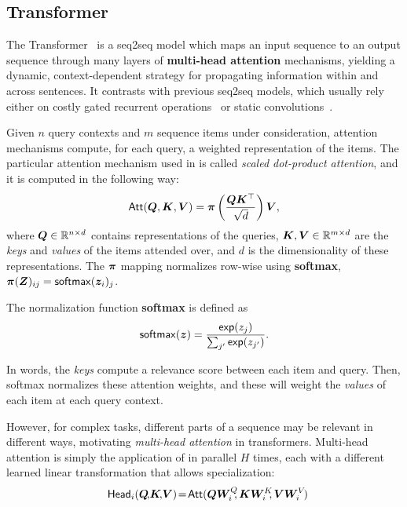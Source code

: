 \subsection{Transformer}

The Transformer~\citep{vaswani2017attention} is a seq2seq model which
maps an input sequence to an output sequence through many layers of
\textbf{multi-head attention} mechanisms, yielding a dynamic,
context-dependent strategy for propagating information within and
across sentences. It contrasts with previous seq2seq models, which
usually rely either on costly gated recurrent operations~\citep[often
    LSTMs:][]{bahdanau2014neural,luong2015effective} or static
convolutions~\citep{convseq}.

Given $n$ query contexts and $m$ sequence items under consideration,
attention mechanisms compute, for each query, a weighted
representation of the items. The particular attention mechanism used
in \citet{vaswani2017attention} is called \emph{scaled dot-product
    attention}, and it is computed in the following way:
%
\begin{equation}
    \operatorname{\mathsf{Att}}(\bm{Q}, \bm{K}, \bm{V}) = \bm{\pi}
    \left(\frac{\bm{Q}\bm{K}^\top}{\sqrt{d}}\right) \bm{V},
    \label{eq:att_scaled_dot}
\end{equation}
%
where $\bm{Q} \in \mathbb{R}^{n \times d}$ contains
representations of the queries, $\bm{K}, \bm{V} \in \mathbb{R}^{m \times
        d}$ are the \emph{keys} and \emph{values} of the items attended over,
and $d$ is the dimensionality of these representations. The $\bm{\pi}$
mapping normalizes row-wise using \textbf{softmax},
$\bm{\pi}(\bm{Z})_{ij} = \operatorname*{\mathsf{softmax}}(\bm{z}_i)_j$.

\begin{definition}
    The normalization function \textbf{softmax} is defined as
    \begin{equation}\label{eq:softmax}
        \operatorname*{\mathsf{softmax}}(\bm{z}) = \frac{\operatorname*{\mathsf{exp}}(z_j)}{\sum_{j'} \operatorname*{\mathsf{exp}}(z_{j'})}.
    \end{equation}
\end{definition}

In words, the \emph{keys} compute a relevance score between each item
and query. Then, softmax normalizes these attention weights, and
these will weight the \emph{values} of each item at each query
context.

However, for complex tasks, different parts of a sequence may be
relevant in different ways, motivating \emph{multi-head attention} in
transformers. Multi-head attention is simply the application of
 in parallel $H$ times, each with a
different learned linear transformation that allows specialization:
%
\begin{equation}\label{eq:head}%
    \hspace{-.01ex}%
    \ath_i(\bm{Q}\!,\!\bm{K}\!,\!\bm{V})\!=\!\att(\bm{QW}_i^Q\!\!,\bm{KW}_i^K\!\!,\bm{VW}_i^V\!)%
    \hspace{-1.5ex}%
\end{equation}


